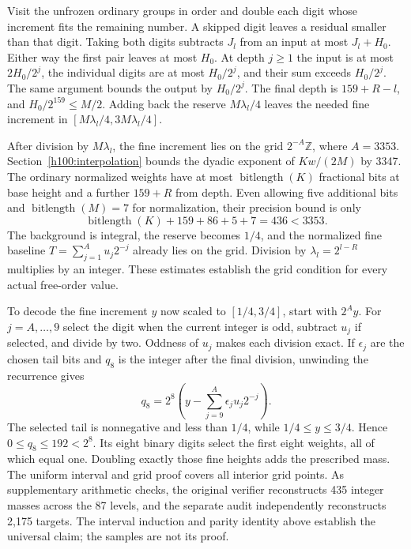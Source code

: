 \documentclass[11pt]{article}
\numberwithin{equation}{section}
\theoremstyle{definition}
\theoremstyle{remark}
\begin{document}
Visit the unfrozen ordinary groups in order and double each digit whose increment fits the remaining number. A skipped digit leaves a residual smaller than that digit. Taking both digits subtracts \(J_l\) from an input at most \(J_l+H_0\). Either way the first pair leaves at most \(H_0\). At depth \(j\ge1\) the input is at most \(2H_0/2^j\), the individual digits are at most \(H_0/2^j\), and their sum exceeds \(H_0/2^j\). The same argument bounds the output by \(H_0/2^j\). The final depth is \(159+R-l\), and \(H_0/2^{159}\le M/2\). Adding back the reserve \(M\lambda_l/4\) leaves the needed fine increment in \([M\lambda_l/4,3M\lambda_l/4]\).

After division by \(M\lambda_l\), the fine increment lies on the grid \(2^{-A}\mathbb Z\), where \(A=3353\). Section~\ref{h100:interpolation} bounds the dyadic exponent of \(Kw/(2M)\) by 3347. The ordinary normalized weights have at most \(\operatorname{bitlength}(K)\) fractional bits at base height and a further \(159+R\) from depth. Even allowing five additional bits and \(\operatorname{bitlength}(M)=7\) for normalization, their precision bound is only \[
 \operatorname{bitlength}(K)+159+86+5+7=436<3353.
\] The background is integral, the reserve becomes \(1/4\), and the normalized fine baseline \(T=\sum_{j=1}^A u_j2^{-j}\) already lies on the grid. Division by \(\lambda_l=2^{l-R}\) multiplies by an integer. These estimates establish the grid condition for every actual free-order value.

To decode the fine increment \(y\) now scaled to \([1/4,3/4]\), start with \(2^Ay\). For \(j=A,\ldots,9\) select the digit when the current integer is odd, subtract \(u_j\) if selected, and divide by two. Oddness of \(u_j\) makes each division exact. If \(\epsilon_j\) are the chosen tail bits and \(q_8\) is the integer after the final division, unwinding the recurrence gives \[
 q_8=2^8\left(y-\sum_{j=9}^{A}\epsilon_j u_j2^{-j}\right).
\] The selected tail is nonnegative and less than \(1/4\), while \(1/4\le y\le3/4\). Hence \(0\le q_8\le192<2^8\). Its eight binary digits select the first eight weights, all of which equal one. Doubling exactly those fine heights adds the prescribed mass. The uniform interval and grid proof covers all interior grid points. As supplementary arithmetic checks, the original verifier reconstructs 435 integer masses across the 87 levels, and the separate audit independently reconstructs 2,175 targets. The interval induction and parity identity above establish the universal claim; the samples are not its proof.
\end{document}
